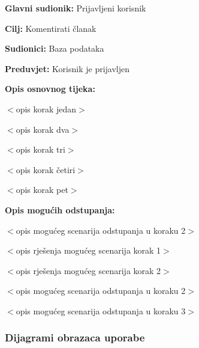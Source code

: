 \noindent {}
\begin{packed_item}

\item \textbf{Glavni sudionik:} Prijavljeni korisnik
\item  \textbf{Cilj:} Komentirati članak
\item  \textbf{Sudionici:} Baza podataka
\item  \textbf{Preduvjet:} Korisnik je prijavljen
\item  \textbf{Opis osnovnog tijeka:}

\item[] \begin{packed_enum}

    \item $<$opis korak jedan$>$
    \item $<$opis korak dva$>$
    \item $<$opis korak tri$>$
    \item $<$opis korak četiri$>$
    \item $<$opis korak pet$>$

\end{packed_enum}

\item  \textbf{Opis mogućih odstupanja:}

\item[] \begin{packed_item}

    \item[2.a] $<$opis mogućeg scenarija odstupanja u koraku 2$>$
    \item[] \begin{packed_enum}

        \item $<$opis rješenja mogućeg scenarija korak 1$>$
        \item $<$opis rješenja mogućeg scenarija korak 2$>$

    \end{packed_enum}

\item[2.b] $<$opis mogućeg scenarija odstupanja u koraku 2$>$
\item[3.a] $<$opis mogućeg scenarija odstupanja  u koraku 3$>$

\end{packed_item}
\end{packed_item}

\subsubsection{Dijagrami obrazaca uporabe}

